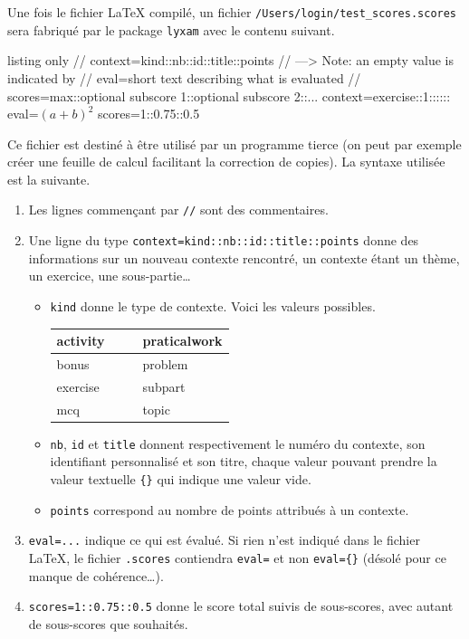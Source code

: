 \documentclass[12pt,a4paper]{scrartcl}
\theoremstyle{definition}
\begin{document}
Une fois le fichier \LaTeX{} compilé, un fichier \verb+/Users/login/test_scores.scores+ sera fabriqué par le package \verb+lyxam+ avec le contenu suivant.

\begin{tcblisting}{listing only}
// context=kind::nb::id::title::points
// ---> Note: an empty value is indicated by {}
// eval=short text describing what is evaluated
// scores=max::optional subscore 1::optional subscore 2::...
context=exercise::1::{}::{}::{}
eval=$(a + b)^2$
scores=1::0.75::0.5
\end{tcblisting}

Ce fichier est destiné à être utilisé par un programme tierce (on peut par exemple créer une feuille de calcul facilitant la correction de copies). La syntaxe utilisée est la suivante.
\begin{enumerate}
	\item Les lignes commençant par \verb+//+ sont des commentaires.

	\item Une ligne du type \verb+context=kind::nb::id::title::points+ donne des informations sur un nouveau contexte rencontré, un contexte étant un thème, un exercice, une sous-partie\dots 
	\begin{itemize}
		\item \verb+kind+ donne le type de contexte. Voici les valeurs possibles.

        \begin{center}
            \begin{tabular}{|ll@{\hskip 0.5ex}|l@{\hskip 0.5ex}l|}
                \hline activity &&& praticalwork \\
                \hline bonus &&& problem \\
                \hline exercise &&& subpart \\
                \hline mcq &&& topic \\
                \hline
            \end{tabular}
        \end{center}

		\item \verb+nb+, \verb+id+ et \verb+title+ donnent respectivement le numéro du contexte, son identifiant personnalisé et son titre, chaque valeur pouvant prendre la valeur textuelle \verb+{}+ qui indique une valeur vide.

		\item \verb+points+ correspond au nombre de points attribués à un contexte.
	\end{itemize}

	\item \verb+eval=...+ indique ce qui est évalué. Si rien n'est indiqué dans le fichier \LaTeX{}, le fichier \verb+.scores+ contiendra \verb+eval=+ et non \verb+eval={}+ (désolé pour ce manque de cohérence\dots).
	
	\item \verb+scores=1::0.75::0.5+ donne le score total suivis de sous-scores, avec autant de sous-scores que souhaités.
\end{enumerate}
\end{document}

